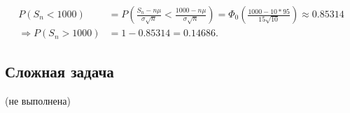 \documentclass[a4paper,11pt]{article}
\begin{document}
\begin{align*}
P(S_n < 1000) & = P(\frac{S_n - n\mu}{\sigma\sqrt{n}} < \frac{1000 - n\mu}{\sigma\sqrt{n}}) 
= \Phi_0(\frac{1000 - 10*95}{15\sqrt{10}}) \approx 0.85314 \\
\Rightarrow 
P(S_n > 1000) & = 1 - 0.85314 = \boxed{0.14686}.
\end{align*}

\subsection{Сложная задача}

(не выполнена)

\end{document}
